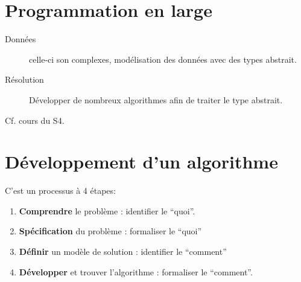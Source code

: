 \documentclass[12pt,a4paper,openany]{book}
\begin{document}
		\section{Programmation en large}
		\begin{description}
			\item[Données] celle-ci son complexes, modélisation des données avec des types abstrait.
			\item[Résolution] Développer de nombreux algorithmes afin de traiter le type abstrait. 
		\end{description}
		Cf. cours du S4.
		\section{Développement d'un algorithme}
		C'est un processus à 4 étapes:
		\begin{enumerate}
			\item \textbf{Comprendre} le problème : identifier le ``quoi''.
			\item \textbf{Spécification} du problème : formaliser le ``quoi''
			\item \textbf{Définir} un modèle de solution : identifier le ``comment''
			\item \textbf{Développer} et trouver l'algorithme : formaliser le ``comment''.
		\end{enumerate}
\end{document}
